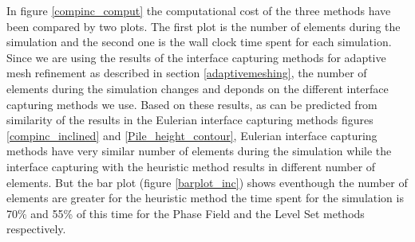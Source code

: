 \documentclass[letterpaper,10pt]{article}
\begin{document}
In figure \ref{compinc_comput} the computational cost of the three methods have been compared by two plots. The first plot is the number of elements during the simulation and the second one is the wall clock time spent for each simulation. Since we are using the results of the interface capturing methods for adaptive mesh refinement as described in section \ref{adaptivemeshing}, the number of elements during the simulation changes and deponds on the different interface capturing methods we use. Based on these results, as can be predicted from similarity of the results in the Eulerian interface capturing methods figures \ref{compinc_inclined} and \ref{Pile_height_contour}, Eulerian interface capturing methods have very similar number of elements during the simulation while the interface capturing with the heuristic method results in different number of elements. But the bar plot (figure \ref{barplot_inc}) shows eventhough the number of elements are greater for the heuristic method the time spent for the simulation is 70\% and 55\% of this time for the Phase Field and the Level Set methods respectively.

\end{document}
